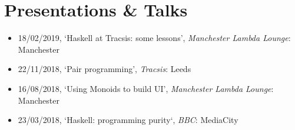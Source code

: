 \section{Presentations \& Talks}

\begin{itemize}
	\item 18/02/2019, `Haskell at Tracsis: some lessons', \emph{Manchester Lambda Lounge}: Manchester
	\item 22/11/2018, `Pair programming', \emph{Tracsis}: Leeds
	\item 16/08/2018, `Using Monoids to build UI', \emph{Manchester Lambda Lounge}: Manchester
	\item 23/03/2018, `Haskell: programming purity`, \emph{BBC}: MediaCity
\end{itemize}